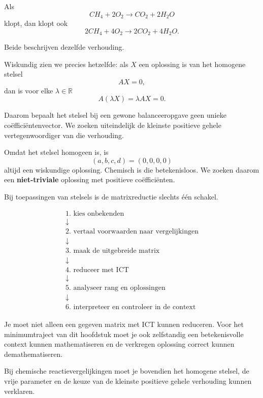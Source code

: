 \documentclass{ximera}
\begin{document}
Als
\[
CH_4+2O_2\longrightarrow CO_2+2H_2O
\]
klopt, dan klopt ook
\[
2CH_4+4O_2\longrightarrow2CO_2+4H_2O.
\]

Beide beschrijven dezelfde verhouding.

Wiskundig zien we precies hetzelfde:
als \(X\) een oplossing is van het homogene stelsel
\[
AX=0,
\]
dan is voor elke \(\lambda\in\mathbb{R}\)
\[
A(\lambda X)=\lambda AX=0.
\]

Daarom bepaalt het stelsel bij een gewone balanceeropgave geen unieke
coëfficiëntenvector. We zoeken uiteindelijk de kleinste positieve gehele
vertegenwoordiger van die verhouding.

\begin{opmerking}[De nuloplossing]
Omdat het stelsel homogeen is, is
\[
(a,b,c,d)=(0,0,0,0)
\]
altijd een wiskundige oplossing. Chemisch is die betekenisloos.
We zoeken daarom een \textbf{niet-triviale} oplossing met positieve
coëfficiënten.
\end{opmerking}




Bij toepassingen van stelsels is de matrixreductie slechts één schakel.

\[
\boxed{
\begin{array}{c}
\text{1. kies onbekenden}\\
\downarrow\\
\text{2. vertaal voorwaarden naar vergelijkingen}\\
\downarrow\\
\text{3. maak de uitgebreide matrix}\\
\downarrow\\
\text{4. reduceer met ICT}\\
\downarrow\\
\text{5. analyseer rang en oplossingen}\\
\downarrow\\
\text{6. interpreteer en controleer in de context}
\end{array}}
\]

\begin{opmerking}
Je moet niet alleen een gegeven matrix met ICT kunnen reduceren.
Voor het minimumtraject van dit hoofdstuk moet je ook zelfstandig een
betekenisvolle context kunnen mathematiseren en de verkregen oplossing
correct kunnen demathematiseren.

Bij chemische reactievergelijkingen moet je bovendien het homogene stelsel,
de vrije parameter en de keuze van de kleinste positieve gehele verhouding
kunnen verklaren.
\end{opmerking}
\end{document}
